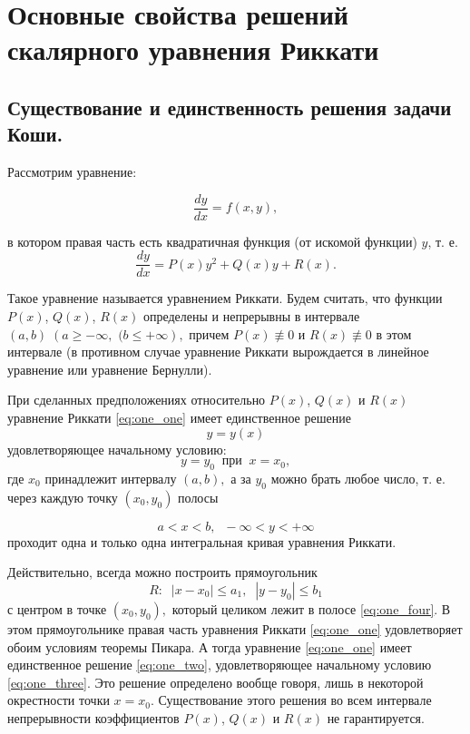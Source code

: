 \chapter{Основные свойства решений скалярного уравнения Риккати} 

\section{Существование и единственность решения задачи Коши.}
Рассмотрим уравнение:

$$\dfrac{dy}{dx} = f \left( x, y \right),$$

в котором правая часть есть квадратичная функция (от искомой функции) $y$, т. е.
\begin{equation}  \label{eq:one_one}
    \dfrac{dy}{dx} = P \left( x \right) y^2 + Q \left( x \right) y + R \left( x \right).
\end{equation}

Такое уравнение называется уравнением Риккати. Будем считать, что функции $P \left( x \right)$, $Q \left( x \right)$, $R \left( x \right)$ определены и непрерывны в интервале $\left( a, b \right) \; \left( a \geqslant -\infty,\right.$ $\left.( b \leqslant +\infty \right),$ причем $P \left( x \right) \not\equiv 0$ и $R \left( x \right) \not\equiv 0$ в этом интервале (в противном случае уравнение Риккати вырождается в линейное уравнение или уравнение Бернулли).

При сделанных предположениях относительно $P \left( x \right)$, $Q \left( x \right)$ и $R \left( x \right)$ уравнение Риккати \ref{eq:one_one} имеет единственное решение
\begin{equation}  \label{eq:one_two}
    y = y \left( x \right)
\end{equation}
удовлетворяющее начальному условию:
\begin{equation}  \label{eq:one_three}
    y = y_{0} \; \; \text{при} \; \; x = x_{0},
\end{equation}
где $x_{0}$ принадлежит интервалу $\left( a, b \right),$ а за $y_{0}$ можно брать любое число, т. е. через каждую точку $\left( x_{0}, y_{0} \right)$ полосы

\begin{equation}  \label{eq:one_four}
    a < x < b, \; \; -\infty < y < +\infty
\end{equation}
проходит одна и только одна интегральная кривая уравнения Риккати.

Действительно, всегда можно построить прямоугольник
$$ R: \; \; \left| x - x_{0} \right| \leqslant a_{1}, \; \; \left| y - y_{0} \right| \leqslant b_{1}$$
с центром в точке $\left( x_{0}, y_{0} \right),$ который целиком лежит в полосе \ref{eq:one_four}. В этом прямоугольнике правая часть уравнения Риккати \ref{eq:one_one} удовлетворяет обоим условиям теоремы Пикара. А тогда уравнение \ref{eq:one_one} имеет единственное решение \ref{eq:one_two}, удовлетворяющее начальному условию \ref{eq:one_three}. Это решение определено вообще говоря, лишь в некоторой окрестности точки $x = x_{0}.$ Существование этого решения во всем интервале непрерывности коэффициентов $P \left( x \right)$, $Q \left( x \right)$ и $R \left( x \right)$ не гарантируется.

